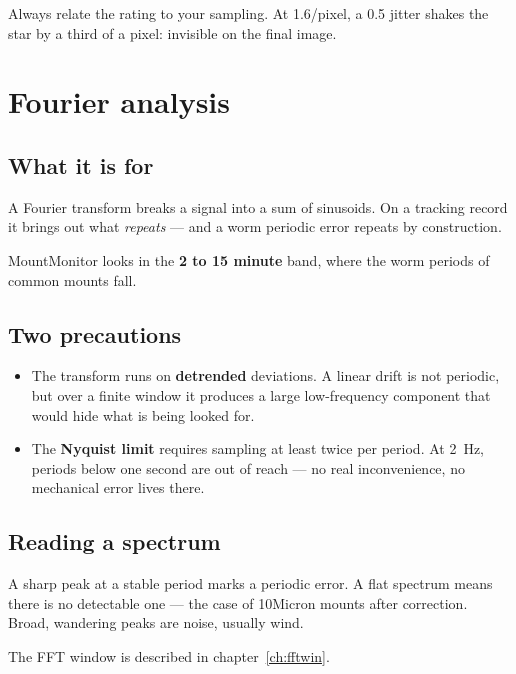 \begin{tip}
Always relate the rating to your sampling. At 1.6\arcsec/pixel, a
0.5\arcsec{} jitter shakes the star by a third of a pixel: invisible on the
final image.
\end{tip}

\chapter{Fourier analysis}
\label{ch:fft}

\section{What it is for}

A Fourier transform breaks a signal into a sum of sinusoids. On a tracking
record it brings out what \emph{repeats} --- and a worm periodic error repeats
by construction.

MountMonitor looks in the \textbf{2 to 15 minute} band, where the worm periods
of common mounts fall.

\section{Two precautions}

\begin{itemize}
  \item The transform runs on \textbf{detrended} deviations. A linear drift is
  not periodic, but over a finite window it produces a large low-frequency
  component that would hide what is being looked for.
  \item The \textbf{Nyquist limit} requires sampling at least twice per period.
  At 2~Hz, periods below one second are out of reach --- no real inconvenience,
  no mechanical error lives there.
\end{itemize}

\section{Reading a spectrum}

A sharp peak at a stable period marks a periodic error. A flat spectrum means
there is no detectable one --- the case of 10Micron mounts after correction.
Broad, wandering peaks are noise, usually wind.

The FFT window is described in chapter~\ref{ch:fftwin}.

